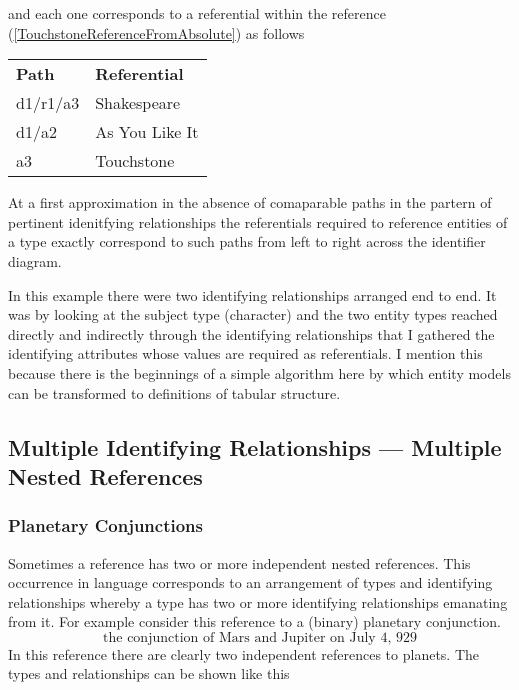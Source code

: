 and each one corresponds to a referential within the reference 
(\ref{TouchstoneReferenceFromAbsolute}) as follows
\begin{tabular}{l l}
\textbf{Path}     & \textbf{Referential} \\
d1/r1/a3 & Shakespeare \\
d1/a2    & As You Like It\\
a3       & Touchstone
\end{tabular}

At a first approximation in the absence of comaparable paths in the partern of pertinent idenitfying relationships the referentials required to reference entities of a type exactly correspond to such paths from left to right across the identifier diagram.

\begin{oldtt}
\begin{notebox}
In this example there were two identifying relationships arranged end to end. It was by looking at the subject type (character) and the two entity types reached directly and indirectly through the identifying relationships
 that I gathered the identifying attributes whose values are required as referentials. 
I mention this because there is the beginnings of a simple algorithm here by which entity models can be transformed to definitions of tabular structure.
\end{notebox}
\end{oldtt}
\subsection{Multiple Identifying Relationships --- Multiple Nested References}

\subsubsection{Planetary Conjunctions}
Sometimes a reference has two or more independent  nested references. 
This occurrence in language corresponds to an arrangement of types and identifying relationships whereby a type has two or more identifying relationships emanating from it. For example consider this reference to  a (binary) planetary conjunction.
\begin{equation}
\mbox{the conjunction of Mars and Jupiter on July 4, 929}
\end{equation}
In this reference there are clearly two independent references to planets. 
The types and relationships can be shown like this


